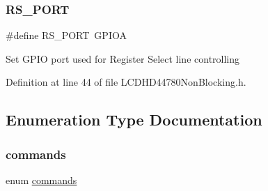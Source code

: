 \subsubsection{\texorpdfstring{RS\_PORT}{RS\_PORT}}
{\footnotesize\ttfamily \#define R\+S\+\_\+\+P\+O\+RT~G\+P\+I\+OA}

Set G\+P\+IO port used for Register Select line controlling 

Definition at line 44 of file L\+C\+D\+H\+D44780\+Non\+Blocking.\+h.



\subsection{Enumeration Type Documentation}
\mbox{\label{group___l_c_d_h_d44780_non_blocking_ga033f2c2ba101d1649bd36de7783782f0_ga033f2c2ba101d1649bd36de7783782f0}} 
\subsubsection{\texorpdfstring{commands}{commands}}
{\footnotesize\ttfamily enum \mbox{\hyperlink{group___l_c_d_h_d44780_non_blocking_ga033f2c2ba101d1649bd36de7783782f0_ga033f2c2ba101d1649bd36de7783782f0}{commands}}}

